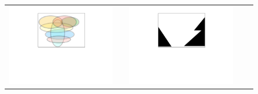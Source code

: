   \begin{figure}[htb]
 \begin{tabular}{ccccc}
\begin{minipage}{0.25\textwidth}
 \includegraphics[width=\linewidth, trim=250  320 260 60,clip]{diagrams/Suff.pdf}
\end{minipage}
 & & 
\begin{minipage}{0.25\textwidth}
 \includegraphics[width=\linewidth, trim=250  320 260 60,clip]{diagrams/Nec.pdf}
\end{minipage}
 & &
\begin{minipage}{0.25\textwidth}

\end{minipage}
\end{tabular}
\end{figure}
